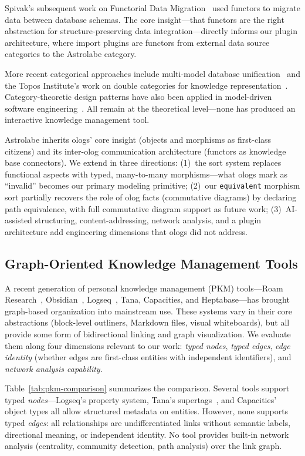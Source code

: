 Spivak's subsequent work on Functorial Data Migration~\cite{Spivak2012FDM} used functors to migrate data between database schemas. The core insight---that functors are the right abstraction for structure-preserving data integration---directly informs our plugin architecture, where import plugins are functors from external data source categories to the Astrolabe category.

More recent categorical approaches include multi-model database unification~\cite{Koupil2022} and the Topos Institute's work on double categories for knowledge representation~\cite{ToposInstitute}. Category-theoretic design patterns have also been applied in model-driven software engineering~\cite{DiskinMaibaum}. All remain at the theoretical level---none has produced an interactive knowledge management tool.

Astrolabe inherits ologs' core insight (objects and morphisms as first-class citizens) and its inter-olog communication architecture (functors as knowledge base connectors). We extend in three directions: (1)~the sort system replaces functional aspects with typed, many-to-many morphisms---what ologs mark as ``invalid'' becomes our primary modeling primitive; (2)~our \texttt{equivalent} morphism sort partially recovers the role of olog facts (commutative diagrams) by declaring path equivalence, with full commutative diagram support as future work; (3)~AI-assisted structuring, content-addressing, network analysis, and a plugin architecture add engineering dimensions that ologs did not address.


\subsection{Graph-Oriented Knowledge Management Tools}
\label{sec:bg-pkm}

A recent generation of personal knowledge management (PKM) tools---Roam Research~\cite{RoamResearch}, Obsidian~\cite{Obsidian}, Logseq~\cite{Logseq}, Tana, Capacities, and Heptabase---has brought graph-based organization into mainstream use. These systems vary in their core abstractions (block-level outliners, Markdown files, visual whiteboards), but all provide some form of bidirectional linking and graph visualization. We evaluate them along four dimensions relevant to our work: \emph{typed nodes}, \emph{typed edges}, \emph{edge identity} (whether edges are first-class entities with independent identifiers), and \emph{network analysis capability}.

Table~\ref{tab:pkm-comparison} summarizes the comparison. Several tools support typed \emph{nodes}---Logseq's property system, Tana's supertags~\cite{Tana}, and Capacities' object types all allow structured metadata on entities. However, none supports typed \emph{edges}: all relationships are undifferentiated links without semantic labels, directional meaning, or independent identity. No tool provides built-in network analysis (centrality, community detection, path analysis) over the link graph.

